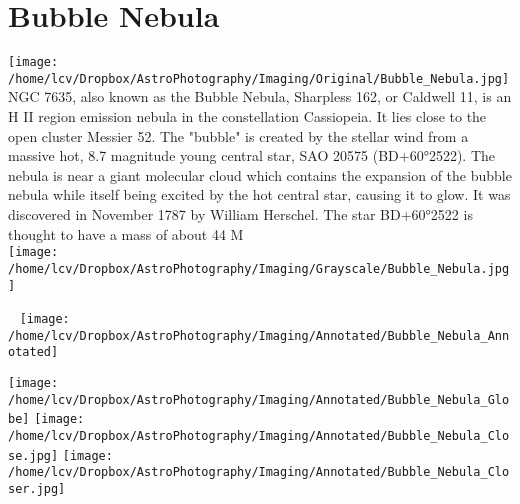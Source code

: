 \section{Bubble Nebula}
\texttt{[image: /home/lcv/Dropbox/AstroPhotography/Imaging/Original/Bubble\_Nebula.jpg]}
{\footnotesize\color{white}
NGC 7635, also known as the Bubble Nebula, Sharpless 162, or Caldwell 11, is an H II region emission nebula in the constellation Cassiopeia. It lies close to the open cluster Messier 52. The "bubble" is created by the stellar wind from a massive hot, 8.7 magnitude young central star, SAO 20575 (BD+60°2522). The nebula is near a giant molecular cloud which contains the expansion of the bubble nebula while itself being excited by the hot central star, causing it to glow. It was discovered in November 1787 by William Herschel. The star BD+60°2522 is thought to have a mass of about 44 M 
}\ \\
\texttt{[image: /home/lcv/Dropbox/AstroPhotography/Imaging/Grayscale/Bubble\_Nebula.jpg]}
\begin{center}
 \ \newpage
\texttt{[image: /home/lcv/Dropbox/AstroPhotography/Imaging/Annotated/Bubble\_Nebula\_Annotated]}

\texttt{[image: /home/lcv/Dropbox/AstroPhotography/Imaging/Annotated/Bubble\_Nebula\_Globe]}
\texttt{[image: /home/lcv/Dropbox/AstroPhotography/Imaging/Annotated/Bubble\_Nebula\_Close.jpg]}
\texttt{[image: /home/lcv/Dropbox/AstroPhotography/Imaging/Annotated/Bubble\_Nebula\_Closer.jpg]}
\end{center}
